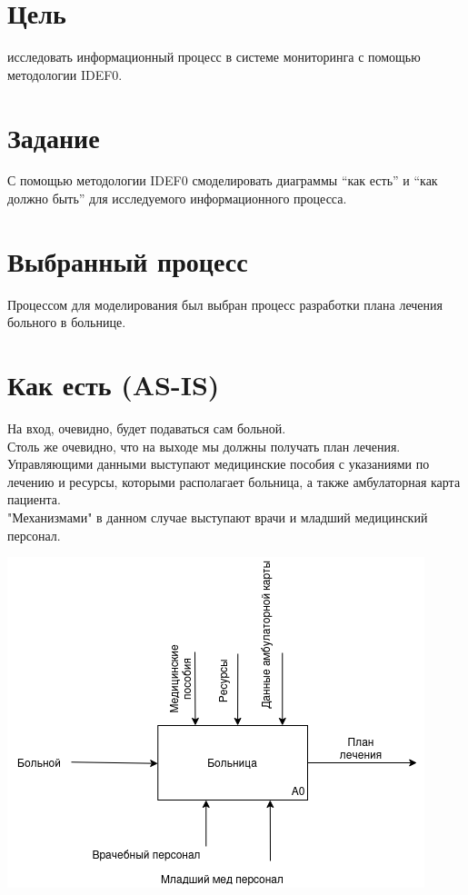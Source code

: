 \documentclass[a4paper, 12pt]{article}
\begin{document}

\pagebreak
\tableofcontents
\newpage
\section*{Цель}
исследовать информационный процесс в системе мониторинга с
помощью методологии IDEF0.
\section*{Задание}
С помощью методологии IDEF0 смоделировать диаграммы
“как есть” и “как должно быть” для исследуемого информационного процесса.
\section*{Выбранный процесс}
Процессом для моделирования был выбран процесс разработки плана лечения больного в больнице.
\newpage
\section{Как есть (AS-IS)}
На вход, очевидно, будет подаваться сам больной. \\
Столь же очевидно, что на выходе мы должны получать план лечения.\\
Управляющими данными выступают медицинские пособия с указаниями по лечению и ресурсы, которыми располагает больница, а также амбулаторная карта пациента. \\
"Механизмами" в данном случае выступают врачи и младший медицинский персонал.
\begin{center}
  \centering
  \includegraphics[width=.7\linewidth]{extra/as-is_context.png}
  \label{fig:prplot}
\end{center}
\end{document}
